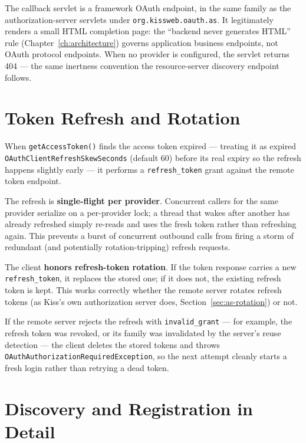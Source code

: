 \begin{notebox}
The callback servlet is a framework OAuth endpoint, in the same family as the authorization-server servlets under \texttt{org.kissweb.oauth.as}.  It legitimately renders a small HTML completion page: the ``backend never generates HTML'' rule (Chapter~\ref{ch:architecture}) governs application business endpoints, not OAuth protocol endpoints.  When no provider is configured, the servlet returns 404 --- the same inertness convention the resource-server discovery endpoint follows.
\end{notebox}

\section{Token Refresh and Rotation}
\label{sec:oc-refresh}

When \texttt{getAccessToken()} finds the access token expired --- treating it as expired \texttt{OAuthClientRefreshSkewSeconds} (default 60) before its real expiry so the refresh happens slightly early --- it performs a \texttt{refresh\_token} grant against the remote token endpoint.

The refresh is \textbf{single-flight per provider}.  Concurrent callers for the same provider serialize on a per-provider lock; a thread that wakes after another has already refreshed simply re-reads and uses the fresh token rather than refreshing again.  This prevents a burst of concurrent outbound calls from firing a storm of redundant (and potentially rotation-tripping) refresh requests.

The client \textbf{honors refresh-token rotation}.  If the token response carries a new \texttt{refresh\_token}, it replaces the stored one; if it does not, the existing refresh token is kept.  This works correctly whether the remote server rotates refresh tokens (as Kiss's own authorization server does, Section~\ref{sec:as-rotation}) or not.

If the remote server rejects the refresh with \texttt{invalid\_grant} --- for example, the refresh token was revoked, or its family was invalidated by the server's reuse detection --- the client deletes the stored tokens and throws \texttt{OAuthAuthorizationRequiredException}, so the next attempt cleanly starts a fresh login rather than retrying a dead token.

\section{Discovery and Registration in Detail}
\label{sec:oc-discovery}

